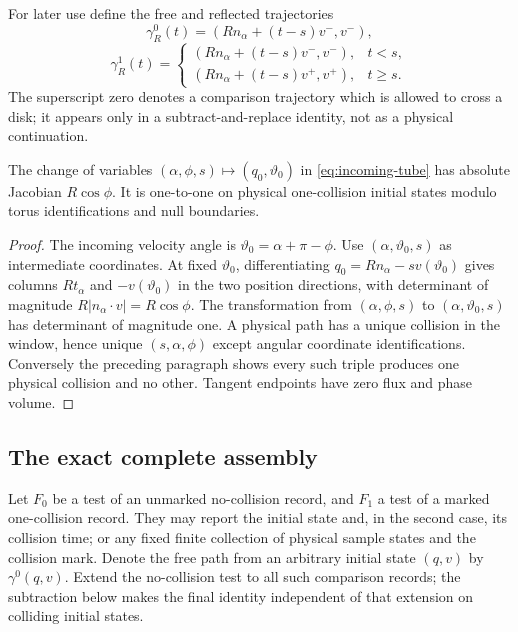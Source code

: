 For later use define the free and reflected trajectories
\[
 \gamma_R^0(t)=(Rn_\alpha+(t-s)v^-,v^-),
\]
\[
 \gamma_R^1(t)=
 \begin{cases}(Rn_\alpha+(t-s)v^-,v^-),&t<s,\\
 (Rn_\alpha+(t-s)v^+,v^+),&t\ge s.
 \end{cases}
 \label{eq:reflected-path}
\]
The superscript zero denotes a comparison trajectory which is allowed to cross a disk; it appears only in a subtract-and-replace identity, not as a physical continuation.

\begin{lemma}\label{lem:tube-jacobian}
The change of variables $(\alpha,\phi,s)\mapsto(q_0,\vartheta_0)$ in \eqref{eq:incoming-tube} has absolute Jacobian $R\cos\phi$. It is one-to-one on physical one-collision initial states modulo torus identifications and null boundaries.
\end{lemma}
\begin{proof}
The incoming velocity angle is $\vartheta_0=\alpha+\pi-\phi$. Use $(\alpha,\vartheta_0,s)$ as intermediate coordinates. At fixed $\vartheta_0$, differentiating $q_0=Rn_\alpha-sv(\vartheta_0)$ gives columns $Rt_\alpha$ and $-v(\vartheta_0)$ in the two position directions, with determinant of magnitude $R|n_\alpha\cdot v|=R\cos\phi$. The transformation from $(\alpha,\phi,s)$ to $(\alpha,\vartheta_0,s)$ has determinant of magnitude one. A physical path has a unique collision in the window, hence unique $(s,\alpha,\phi)$ except angular coordinate identifications. Conversely the preceding paragraph shows every such triple produces one physical collision and no other. Tangent endpoints have zero flux and phase volume.
\end{proof}

\subsection{The exact complete assembly}
Let $F_0$ be a test of an unmarked no-collision record, and $F_1$ a test of a marked one-collision record. They may report the initial state and, in the second case, its collision time; or any fixed finite collection of physical sample states and the collision mark. Denote the free path from an arbitrary initial state $(q,v)$ by $\gamma^0(q,v)$. Extend the no-collision test to all such comparison records; the subtraction below makes the final identity independent of that extension on colliding initial states.

